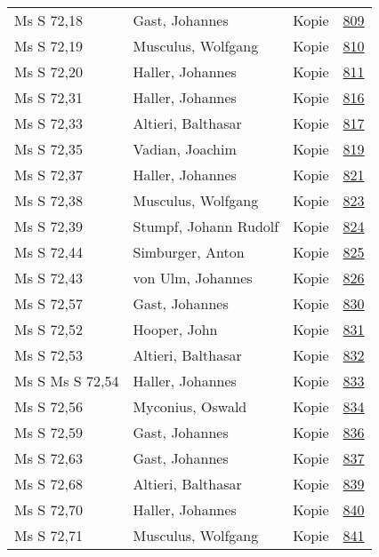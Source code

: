 \documentclass[10pt,a4paper,landscape]{report}
\begin{document}
\begin{longtable}{p{16cm}p{4cm}lr}
Ms S 72,18	&	Gast, Johannes	&	Kopie	&	\href{http://130.60.24.72/assignment/809}{809}\\
Ms S 72,19	&	Musculus, Wolfgang	&	Kopie	&	\href{http://130.60.24.72/assignment/810}{810}\\
Ms S 72,20	&	Haller, Johannes	&	Kopie	&	\href{http://130.60.24.72/assignment/811}{811}\\
Ms S 72,31	&	Haller, Johannes	&	Kopie	&	\href{http://130.60.24.72/assignment/816}{816}\\
Ms S 72,33	&	Altieri, Balthasar	&	Kopie	&	\href{http://130.60.24.72/assignment/817}{817}\\
Ms S 72,35	&	Vadian, Joachim	&	Kopie	&	\href{http://130.60.24.72/assignment/819}{819}\\
Ms S 72,37	&	Haller, Johannes	&	Kopie	&	\href{http://130.60.24.72/assignment/821}{821}\\
Ms S 72,38	&	Musculus, Wolfgang	&	Kopie	&	\href{http://130.60.24.72/assignment/823}{823}\\
Ms S 72,39	&	Stumpf, Johann Rudolf	&	Kopie	&	\href{http://130.60.24.72/assignment/824}{824}\\
Ms S 72,44	&	Simburger, Anton	&	Kopie	&	\href{http://130.60.24.72/assignment/825}{825}\\
Ms S 72,43	&	von Ulm, Johannes	&	Kopie	&	\href{http://130.60.24.72/assignment/826}{826}\\
Ms S 72,57	&	Gast, Johannes	&	Kopie	&	\href{http://130.60.24.72/assignment/830}{830}\\
Ms S 72,52	&	Hooper, John	&	Kopie	&	\href{http://130.60.24.72/assignment/831}{831}\\
Ms S 72,53	&	Altieri, Balthasar	&	Kopie	&	\href{http://130.60.24.72/assignment/832}{832}\\
Ms S Ms S 72,54	&	Haller, Johannes	&	Kopie	&	\href{http://130.60.24.72/assignment/833}{833}\\
Ms S 72,56	&	Myconius, Oswald	&	Kopie	&	\href{http://130.60.24.72/assignment/834}{834}\\
Ms S 72,59	&	Gast, Johannes	&	Kopie	&	\href{http://130.60.24.72/assignment/836}{836}\\
Ms S 72,63	&	Gast, Johannes	&	Kopie	&	\href{http://130.60.24.72/assignment/837}{837}\\
Ms S 72,68	&	Altieri, Balthasar	&	Kopie	&	\href{http://130.60.24.72/assignment/839}{839}\\
Ms S 72,70	&	Haller, Johannes	&	Kopie	&	\href{http://130.60.24.72/assignment/840}{840}\\
Ms S 72,71	&	Musculus, Wolfgang	&	Kopie	&	\href{http://130.60.24.72/assignment/841}{841}\\

\end{longtable}
\end{document}
